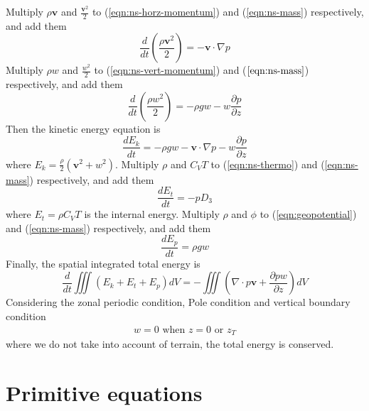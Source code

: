 \documentclass[12pt]{article}
\numberwithin{equation}{section}
\renewcommand{\d}[2]{\frac{d #1}{d #2}}
\newcommand{\dt}[1]{\d{#1}{t}}
\newcommand{\pd}[2]{\frac{\partial #1}{\partial #2}}
\renewcommand{\vec}[1]{\mathbf{#1}}
\begin{document}
Multiply $\rho \vec{v}$ and $\frac{\vec{v}^2}{2}$ to (\ref{eqn:ns-horz-momentum}) and (\ref{eqn:ns-mass}) respectively, and add them
\begin{equation}
  \dt{} \left(\frac{\rho \vec{v}^2}{2}\right) = - \vec{v} \cdot \nabla p 
\end{equation}
Multiply $\rho w$ and $\frac{w^2}{2}$ to (\ref{eqn:ns-vert-momentum}) and ($\ref{eqn:ns-mass}$) respectively, and add them
\begin{equation}
  \dt{} \left(\frac{\rho w^2}{2}\right) = - \rho g w - w \pd{p}{z}
\end{equation}
Then the kinetic energy equation is
\begin{equation}
  \dt{E_k} = - \rho g w - \vec{v} \cdot \nabla{p} - w \pd{p}{z}
\end{equation}
where $E_k = \frac{\rho}{2} \left(\vec{v}^2 + w^2\right)$. Multiply $\rho$ and $C_V T$ to (\ref{eqn:ns-thermo}) and (\ref{eqn:ns-mass}) respectively, and add them 
\begin{equation}
  \dt{E_t} = - p D_3
\end{equation}
where $E_t = \rho C_V T$ is the internal energy. Multiply $\rho$ and $\phi$ to (\ref{eqn:geopotential}) and (\ref{eqn:ns-mass}) respectively, and add them
\begin{equation}
  \dt{E_p} = \rho g w
\end{equation}
Finally, the spatial integrated total energy is
\begin{equation}
  \dt{} \iiint \left(E_k + E_t + E_p\right) dV = - \iiint \left(\nabla \cdot p \vec{v} + \pd{p w}{z}\right) dV
\end{equation}
Considering the zonal periodic condition, Pole condition and vertical boundary condition
\begin{align}
  w = 0 \text{ when } z = 0 \text{ or } z_T
\end{align}
where we do not take into account of terrain, the total energy is conserved.

\section{Primitive equations}
\end{document}
